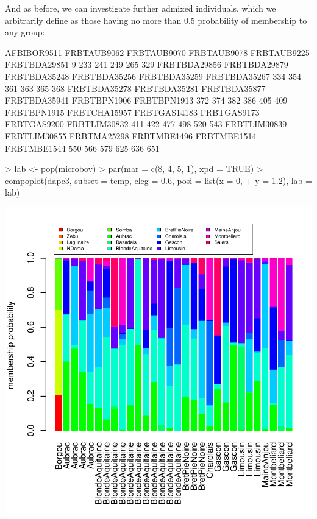 \documentclass{article}
\begin{document}
And as before, we can investigate further admixed individuals, which we arbitrarily define as those
having no more than 0.5 probability of membership to any group:
\begin{Schunk}
\begin{Soutput}
 AFBIBOR9511  FRBTAUB9062  FRBTAUB9070  FRBTAUB9078  FRBTAUB9225 FRBTBDA29851 
           9          233          241          249          265          329 
FRBTBDA29856 FRBTBDA29879 FRBTBDA35248 FRBTBDA35256 FRBTBDA35259 FRBTBDA35267 
         334          354          361          363          365          368 
FRBTBDA35278 FRBTBDA35281 FRBTBDA35877 FRBTBDA35941  FRBTBPN1906  FRBTBPN1913 
         372          374          382          386          405          409 
 FRBTBPN1915 FRBTCHA15957 FRBTGAS14183  FRBTGAS9173  FRBTGAS9200 FRBTLIM30832 
         411          422          477          498          520          543 
FRBTLIM30839 FRBTLIM30855  FRBTMA25298  FRBTMBE1496  FRBTMBE1514  FRBTMBE1544 
         550          566          579          625          636          651 
\end{Soutput}
\begin{Sinput}
> lab <- pop(microbov)
> par(mar = c(8, 4, 5, 1), xpd = TRUE)
> compoplot(dapc3, subset = temp, cleg = 0.6, posi = list(x = 0, 
+     y = 1.2), lab = lab)
\end{Sinput}
\end{Schunk}
\includegraphics{figs/dapc-037}
\end{document}
